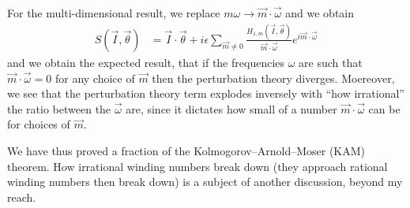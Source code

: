 \documentclass[12pt]{article}
\begin{document}
For the multi-dimensional result, we replace $m\omega \to \vec{m} \cdot
\vec{\omega}$ and we obtain
\begin{align}
    S(\vec{I}, \vec{\theta}) &= \vec{I} \cdot \vec{\theta} + i\epsilon
        \sum\limits_{\vec{m} \neq 0}^{}\frac{H_{1,m}(\vec{I}, \vec{\theta})}
        {\vec{m} \cdot \vec{\omega}}e^{i\vec{m} \cdot \vec{\omega}}
\end{align}
and we obtain the expected result, that if the frequencies $\omega$ are such
that $\vec{m} \cdot \vec{\omega} = 0$ for any choice of $\vec{m}$ then the
perturbation theory diverges. Moereover, we see that the perturbation theory
term explodes inversely with ``how irrational'' the ratio between the
$\vec{\omega}$ are, since it dictates how small of a number $\vec{m} \cdot
\vec{\omega}$ can be for choices of $\vec{m}$.

We have thus proved a fraction of the Kolmogorov–Arnold–Moser (KAM) theorem. How
irrational winding numbers break down (they approach rational winding numbers
then break down) is a subject of another discussion, beyond my reach.
\end{document}
